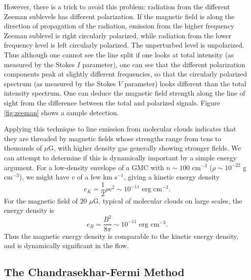 However, there is a trick to avoid this problem: radiation from the different Zeeman sublevels has different polarization. If the magnetic field is along the direction of propagation of the radiation, emission from the higher frequency Zeeman sublevel is right circularly polarized, while radiation from the lower frequency level is left circularly polarized. The unperturbed level is unpolarized. Thus although one cannot see the line split if one looks at total intensity (as measured by the Stokes $I$ parameter), one can see that the different polarization components peak at slightly different frequencies, so that the circularly polarized spectrum (as measured by the Stokes $V$ parameter) looks different than the total intensity spectrum. One can deduce the magnetic field strength along the line of sight from the difference between the total and polarized signals. Figure \ref{fig:zeeman} shows a sample detection.

Applying this technique to line emission from molecular clouds indicates that they are threaded by magnetic fields whose strengths range from tens to thousands of $\mu$G, with higher density gas generally showing stronger fields. We can attempt to determine if this is dynamically important by a simple energy argument. For a low-density envelope of a GMC with $n\sim 100$ cm$^{-3}$ ($\rho \sim 10^{-22}$ g cm$^{-3}$), we might have $v$ of a few km s$^{-1}$, giving a kinetic energy density
\begin{equation}
e_K  = \frac{1}{2}\rho v^2 \sim 10^{-11}\mbox{ erg cm}^{-3}.
\end{equation}
For the magnetic field of $20$ $\mu$G, typical of molecular clouds on large scales, the energy density is
\begin{equation}
e_B = \frac{B^2}{8\pi} \sim 10^{-11} \mbox{ erg cm}^{-3}.
\end{equation}
Thus the magnetic energy density is comparable to the kinetic energy density, and is dynamically significant in the flow.

\subsection{The Chandrasekhar-Fermi Method}

